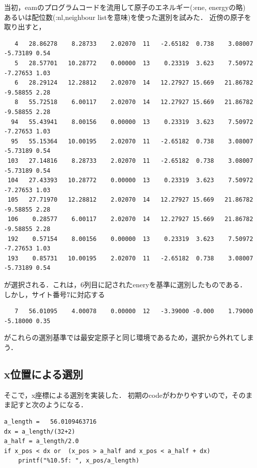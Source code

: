 \documentclass[11pt,dvipdfmx]{jsarticle}
\begin{document}
    当初，eamのプログラムコードを流用して原子のエネルギー(:ene, energyの略)
あるいは配位数(:nl,neighbour listを意味)を使った選別を試みた．
近傍の原子を取り出すと，

\begin{verbatim}
   4   28.86278    8.28733    2.02070  11   -2.65182  0.738    3.08007   -5.73189 0.54
   5   28.57701   10.28772    0.00000  13    0.23319  3.623    7.50972   -7.27653 1.03
   6   28.29124   12.28812    2.02070  14   12.27927 15.669   21.86782   -9.58855 2.28
   8   55.72518    6.00117    2.02070  14   12.27927 15.669   21.86782   -9.58855 2.28
  94   55.43941    8.00156    0.00000  13    0.23319  3.623    7.50972   -7.27653 1.03
  95   55.15364   10.00195    2.02070  11   -2.65182  0.738    3.08007   -5.73189 0.54
 103   27.14816    8.28733    2.02070  11   -2.65182  0.738    3.08007   -5.73189 0.54
 104   27.43393   10.28772    0.00000  13    0.23319  3.623    7.50972   -7.27653 1.03
 105   27.71970   12.28812    2.02070  14   12.27927 15.669   21.86782   -9.58855 2.28
 106    0.28577    6.00117    2.02070  14   12.27927 15.669   21.86782   -9.58855 2.28
 192    0.57154    8.00156    0.00000  13    0.23319  3.623    7.50972   -7.27653 1.03
 193    0.85731   10.00195    2.02070  11   -2.65182  0.738    3.08007   -5.73189 0.54
\end{verbatim}

が選択される．これは，6列目に記されたeneryを基準に選別したものである．
しかし，サイト番号7に対応する

\begin{verbatim}
   7   56.01095    4.00078    0.00000  12   -3.39000 -0.000    1.79000   -5.18000 0.35
\end{verbatim}

がこれらの選別基準では最安定原子と同じ環境であるため，選択から外れてしまう．

    \subsection{x位置による選別}\label{xux4f4dux7f6eux306bux3088ux308bux9078ux5225}

そこで，x座標による選別を実装した．
初期のcodeがわかりやすいので，そのまま記すと次のようになる．

\begin{verbatim}
a_length =   56.0109463716
dx = a_length/(32+2)
a_half = a_length/2.0
if x_pos < dx or  (x_pos > a_half and x_pos < a_half + dx)
    printf("%10.5f: ", x_pos/a_length)
\end{verbatim}
\end{document}
